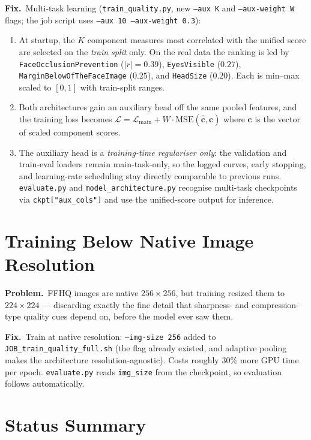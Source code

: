 \documentclass[12pt, letterpaper]{article}
\newcommand{\code}[1]{\texttt{#1}}
\newcommand{\problem}[1]{\textbf{Problem.}~#1}
\newcommand{\fix}[1]{\textbf{Fix.}~#1}
\begin{document}
\fix{Multi-task learning (\code{train\_quality.py}, new \code{--aux K} and
\code{--aux-weight W} flags; the job script uses \code{--aux 10 --aux-weight 0.3}):
\begin{enumerate}[leftmargin=1.6em, itemsep=1pt]
  \item At startup, the $K$ component measures most correlated with the unified
        score are selected on the \emph{train split} only. On the real data the
        ranking is led by \code{FaceOcclusionPrevention} ($|r|=0.39$),
        \code{EyesVisible} ($0.27$), \code{MarginBelowOfTheFaceImage} ($0.25$),
        and \code{HeadSize} ($0.20$). Each is min--max scaled to $[0,1]$ with
        train-split ranges.
  \item Both architectures gain an auxiliary head off the same pooled features,
        and the training loss becomes
        $\mathcal{L} = \mathcal{L}_{\text{main}} + W \cdot
        \mathrm{MSE}(\hat{\mathbf{c}}, \mathbf{c})$
        where $\mathbf{c}$ is the vector of scaled component scores.
  \item The auxiliary head is a \emph{training-time regulariser only}: the
        validation and train-eval loaders remain main-task-only, so the logged
        curves, early stopping, and learning-rate scheduling stay directly
        comparable to previous runs. \code{evaluate.py} and
        \code{model\_architecture.py} recognise multi-task checkpoints via
        \code{ckpt["aux\_cols"]} and use the unified-score output for inference.
\end{enumerate}}

\section{Training Below Native Image Resolution}

\problem{FFHQ images are native $256 \times 256$, but training resized them to
$224 \times 224$ --- discarding exactly the fine detail that sharpness- and
compression-type quality cues depend on, before the model ever saw them.}

\fix{Train at native resolution: \code{--img-size 256} added to
\code{JOB\_train\_quality\_full.sh} (the flag already existed, and adaptive pooling
makes the architecture resolution-agnostic). Costs roughly $30\%$ more GPU time per
epoch. \code{evaluate.py} reads \code{img\_size} from the checkpoint, so evaluation
follows automatically.}

\section{Status Summary}
\end{document}

